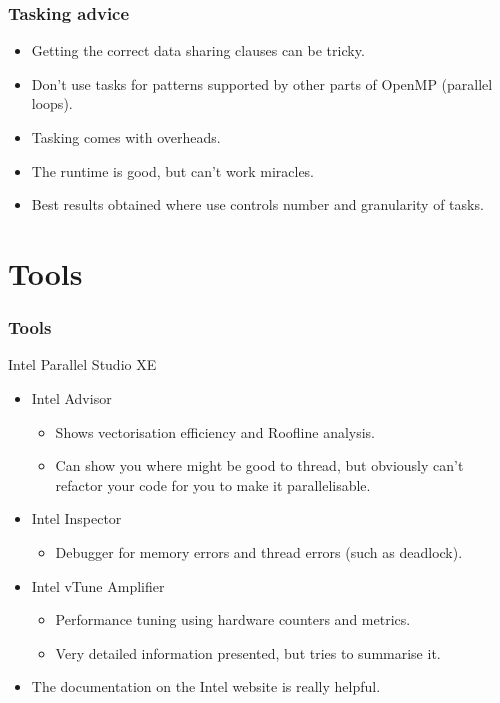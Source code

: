 \documentclass{beamer}
\begin{document}
\begin{frame}
\frametitle{Tasking advice}
\begin{itemize}
  \item Getting the correct data sharing clauses can be tricky.
  \item Don't use tasks for patterns supported by other parts of OpenMP (parallel loops).
  \item Tasking comes with overheads.
  \item The runtime is good, but can't work miracles.
  \item Best results obtained where use controls number and granularity of tasks.
\end{itemize}
\end{frame}

\section{Tools}
\begin{frame}
\frametitle{Tools}
Intel Parallel Studio XE
\begin{itemize}
  \item Intel Advisor
    \begin{itemize}
      \item Shows vectorisation efficiency and Roofline analysis.
      \item Can show you where might be good to thread, but obviously can't refactor your code for you to make it parallelisable.
    \end{itemize}

  \item Intel Inspector
    \begin{itemize}
      \item Debugger for memory errors and thread errors (such as deadlock).
    \end{itemize}

  \item Intel vTune Amplifier
    \begin{itemize}
      \item Performance tuning using hardware counters and metrics.
      \item Very detailed information presented, but tries to summarise it.
    \end{itemize}

  \item The documentation on the Intel website is really helpful.
\end{itemize}
\end{frame}
\end{document}
